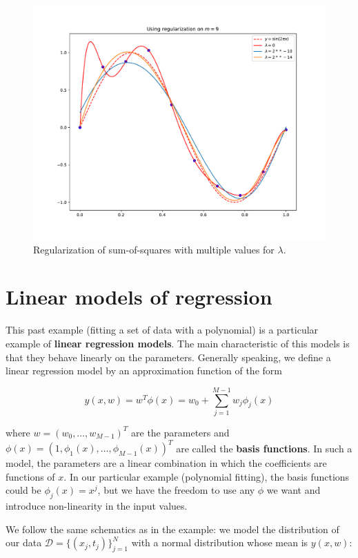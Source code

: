 \begin{figure}[H]
	\centering
	\includegraphics[width=1\textwidth]{images/regularization.pdf}
	\caption{Regularization of sum-of-squares with multiple values for $\lambda$.}
\end{figure}

\section{Linear models of regression}

This past example (fitting a set of data with a polynomial) is a particular example of \textbf{linear regression models}. The main characteristic of this models is that they behave linearly on the parameters. Generally speaking, we define a linear regression model by an approximation function of the form

\[y(x,w) = w^T\phi(x) = w_0 + \sum_{j=1}^{M-1}w_j\phi_j(x)\]

where $w = (w_0,\dots,w_{M-1})^T$ are the parameters and $\phi(x) = (1, \phi_1(x),\dots, \phi_{M-1}(x))^T$ are called the \textbf{basis functions}. In such a model, the parameters are a linear combination in which the coefficients are functions of $x$. In our particular example (polynomial fitting), the basis functions could be $\phi_j(x) = x^j$, but we have the freedom to use any $\phi$ we want and introduce non-linearity in the input values.

We follow the same schematics as in the example: we model the distribution of our data $\mathcal{D} = \{(x_j, t_j)\}_{j=1}^N$ with a normal distribution whose mean is $y(x,w)$:

